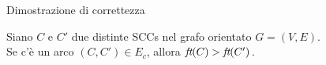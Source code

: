 \begin{frame}{Dimostrazione di correttezza}

\vspace{-6pt}
\begin{myboxtitle}[Teorema]
Siano $C$ e $C'$ due distinte SCCs nel grafo orientato $G=(V,E)$. \\ 
Se c'è un arco $(C,C') \in E_c$, allora $\textit{ft}(C) > \textit{ft}(C')$.
\end{myboxtitle}

\end{frame}


